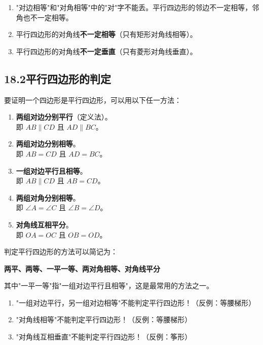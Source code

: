 \documentclass[12pt, a4paper]{ctexart}
\begin{document}
\begin{warnbox}[易错提醒]
\begin{enumerate}[label=\arabic*.]
  \item "对边相等"和"对角相等"中的"对"字不能丢。平行四边形的邻边不一定相等，邻角也不一定相等。
  \item 平行四边形的对角线\textbf{不一定相等}（只有矩形对角线相等）。
  \item 平行四边形的对角线\textbf{不一定垂直}（只有菱形对角线垂直）。
\end{enumerate}
\end{warnbox}

\subsection*{18.2\quad 平行四边形的判定}

\begin{knowledgebox}[平行四边形的判定方法（5种）]
要证明一个四边形是平行四边形，可以用以下任一方法：
\begin{enumerate}[label=\textbf{方法\arabic*：}]
  \item \textbf{两组对边分别平行}（定义法）。\\
  即 $AB \parallel CD$ 且 $AD \parallel BC$。
  \item \textbf{两组对边分别相等}。\\
  即 $AB = CD$ 且 $AD = BC$。
  \item \textbf{一组对边平行且相等}。\\
  即 $AB \parallel CD$ 且 $AB = CD$。
  \item \textbf{两组对角分别相等}。\\
  即 $\angle A = \angle C$ 且 $\angle B = \angle D$。
  \item \textbf{对角线互相平分}。\\
  即 $OA = OC$ 且 $OB = OD$。
\end{enumerate}
\end{knowledgebox}

\begin{tipbox}[判定口诀]
判定平行四边形的方法可以简记为：
\begin{center}
\textbf{两平、两等、一平一等、两对角相等、对角线平分}
\end{center}
其中"一平一等"指"一组对边平行且相等"，这是最常用的方法之一。
\end{tipbox}

\begin{warnbox}[易错提醒]
\begin{enumerate}[label=\arabic*.]
  \item "一组对边平行，另一组对边相等"不能判定平行四边形！（反例：等腰梯形）
  \item "对角线相等"不能判定平行四边形！（反例：等腰梯形）
  \item "对角线互相垂直"不能判定平行四边形！（反例：筝形）
\end{enumerate}
\end{warnbox}
\end{document}
